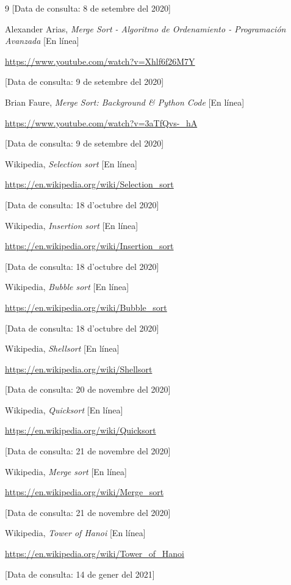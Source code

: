 \begin{thebibliography}{9}
		[Data de consulta: 8 de setembre del 2020]

	\bibitem{}
		Alexander Arias,
		\textit{Merge Sort - Algoritmo de Ordenamiento - Programación Avanzada}
		[En línea]

		\href{https://www.youtube.com/watch?v=Xhlf6f26M7Y}{https://www.youtube.com/watch?v=Xhlf6f26M7Y}
		
		[Data de consulta: 9 de setembre del 2020]

	\bibitem{}
		Brian Faure,
		\textit{Merge Sort: Background \& Python Code}
		[En línea]

		\href{https://www.youtube.com/watch?v=3aTfQvs-\_hA}{https://www.youtube.com/watch?v=3aTfQvs-\_hA}
		
		[Data de consulta: 9 de setembre del 2020]


	\bibitem{}
		Wikipedia,
		\textit{Selection sort}
		[En línea]

		\href{https://en.wikipedia.org/wiki/Selection\_sort}{https://en.wikipedia.org/wiki/Selection\_sort}

		[Data de consulta: 18 d'octubre del 2020]


	\bibitem{}
		Wikipedia,
		\textit{Insertion sort}
		[En línea]

		\href{https://en.wikipedia.org/wiki/Insertion\_sort}{https://en.wikipedia.org/wiki/Insertion\_sort}

		[Data de consulta: 18 d'octubre del 2020]

	\bibitem{}
		Wikipedia,
		\textit{Bubble sort}
		[En línea]

		\href{https://en.wikipedia.org/wiki/Bubble\_sort}{https://en.wikipedia.org/wiki/Bubble\_sort}

		[Data de consulta: 18 d'octubre del 2020]

	\bibitem{}
		Wikipedia,
		\textit{Shellsort}
		[En línea]

		\href{https://en.wikipedia.org/wiki/Shellsort}{https://en.wikipedia.org/wiki/Shellsort}

		[Data de consulta: 20 de novembre del 2020]

	\bibitem{}
		Wikipedia,
		\textit{Quicksort}
		[En línea]

		\href{https://en.wikipedia.org/wiki/Quicksort}{https://en.wikipedia.org/wiki/Quicksort}

		[Data de consulta: 21 de novembre del 2020]

	\bibitem{}
		Wikipedia,
		\textit{Merge sort}
		[En línea]

		\href{https://en.wikipedia.org/wiki/Merge\_sort}{https://en.wikipedia.org/wiki/Merge\_sort}

		[Data de consulta: 21 de novembre del 2020]

	\bibitem{}
		Wikipedia,
		\textit{Tower of Hanoi}
		[En línea]

		\href{https://en.wikipedia.org/wiki/Tower\_of\_Hanoi}{https://en.wikipedia.org/wiki/Tower\_of\_Hanoi}

		[Data de consulta: 14 de gener del 2021]

\end{thebibliography}